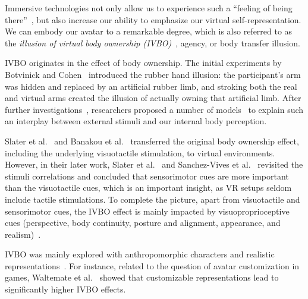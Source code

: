 \documentclass{sigchi}
\begin{document}
Immersive technologies not only allow us to experience such a ``feeling of being there''~\cite{heeter1992being}, but also increase our ability to emphasize our virtual self-representation. We can embody our avatar to a remarkable degree, which is also referred to as the \textit{illusion of virtual body ownership (IVBO)}~\cite{lugrin2015anthropomorphism}, agency, or body transfer illusion.

IVBO originates in the effect of body ownership. The initial experiments by Botvinick and Cohen~ introduced the rubber hand illusion: the participant's arm was hidden and replaced by an artificial rubber limb, and stroking both the real and virtual arms created the illusion of actually owning that artificial limb. After further investigations~\cite{tsakiris2005rubber}, researchers proposed a number of models~\cite{tsakiris2010my,ehrsson2007experimental,petkova2008if,lenggenhager2007video} to explain such an interplay between external stimuli and our internal body perception.

Slater et al.~ and Banakou et al.~ transferred the original body ownership effect, including the underlying visuotactile stimulation, to virtual environments. However, in their later work, Slater et al.~\cite{slater2010first} and Sanchez-Vives et al.~\cite{sanchez2010virtual} revisited the stimuli correlations and concluded that sensorimotor cues are more important than the visuotactile cues, which is an important insight, as VR setups seldom include tactile stimulations. To complete the picture, apart from visuotactile and sensorimotor cues, the IVBO effect is mainly impacted by visuoproprioceptive cues (perspective, body continuity, posture and alignment, appearance, and realism)~\cite{slater2009inducing,slater2010first,perez2012my,maselli2013building}. 



IVBO was mainly explored with anthropomorphic characters and realistic representations~\cite{lugrin2015anthropomorphism, lin2016need,jo2017impact}. For instance, related to the question of avatar customization in games, Waltemate et al.~ showed that customizable representations lead to significantly higher IVBO effects. 
\end{document}
